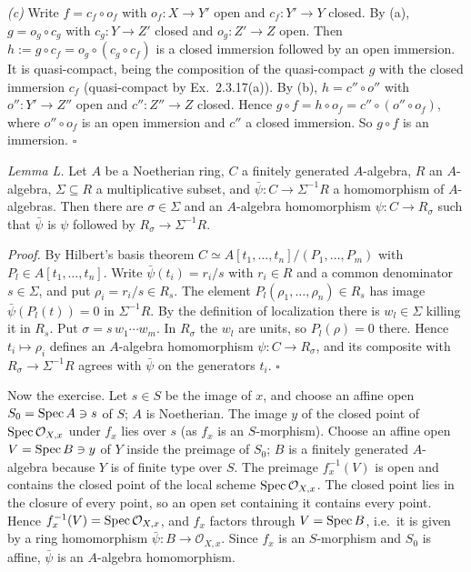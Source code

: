 \documentclass[11pt]{article}
\begin{document}
\emph{(c)} Write $f=c_f\circ o_f$ with $o_f:X\to Y'$ open and $c_f:Y'\to Y$ closed. By (a), $g=o_g\circ c_g$ with $c_g:Y\to Z'$ closed and $o_g:Z'\to Z$ open. Then $h:=g\circ c_f=o_g\circ(c_g\circ c_f)$ is a closed immersion followed by an open immersion. It is quasi-compact, being the composition of the quasi-compact $g$ with the closed immersion $c_f$ (quasi-compact by Ex.~2.3.17(a)). By (b), $h=c''\circ o''$ with $o'':Y'\to Z''$ open and $c'':Z''\to Z$ closed. Hence $g\circ f=h\circ o_f=c''\circ(o''\circ o_f)$, where $o''\circ o_f$ is an open immersion and $c''$ a closed immersion. So $g\circ f$ is an immersion. \hfill$\square$

\pf
\emph{Lemma L.} Let $A$ be a Noetherian ring, $C$ a finitely generated $A$-algebra, $R$ an $A$-algebra, $\Sigma\subseteq R$ a multiplicative subset, and $\bar\psi:C\to\Sigma^{-1}R$ a homomorphism of $A$-algebras. Then there are $\sigma\in\Sigma$ and an $A$-algebra homomorphism $\psi:C\to R_\sigma$ such that $\bar\psi$ is $\psi$ followed by $R_\sigma\to\Sigma^{-1}R$.

\emph{Proof.} By Hilbert's basis theorem $C\simeq A[t_1,\dots,t_n]/(P_1,\dots,P_m)$ with $P_l\in A[t_1,\dots,t_n]$. Write $\bar\psi(t_i)=r_i/s$ with $r_i\in R$ and a common denominator $s\in\Sigma$, and put $\rho_i=r_i/s\in R_s$. The element $P_l(\rho_1,\dots,\rho_n)\in R_s$ has image $\bar\psi(P_l(t))=0$ in $\Sigma^{-1}R$. By the definition of localization there is $w_l\in\Sigma$ killing it in $R_s$. Put $\sigma=s\,w_1\cdots w_m$. In $R_\sigma$ the $w_l$ are units, so $P_l(\rho)=0$ there. Hence $t_i\mapsto\rho_i$ defines an $A$-algebra homomorphism $\psi:C\to R_\sigma$, and its composite with $R_\sigma\to\Sigma^{-1}R$ agrees with $\bar\psi$ on the generators $t_i$. \hfill$\square$

Now the exercise. Let $s\in S$ be the image of $x$, and choose an affine open $S_0=\operatorname{Spec} A\ni s$ of $S$; $A$ is Noetherian. The image $y$ of the closed point of $\operatorname{Spec}\mathcal O_{X,x}$ under $f_x$ lies over $s$ (as $f_x$ is an $S$-morphism). Choose an affine open $V=\operatorname{Spec} B\ni y$ of $Y$ inside the preimage of $S_0$; $B$ is a finitely generated $A$-algebra because $Y$ is of finite type over $S$. The preimage $f_x^{-1}(V)$ is open and contains the closed point of the local scheme $\operatorname{Spec}\mathcal O_{X,x}$. The closed point lies in the closure of every point, so an open set containing it contains every point. Hence $f_x^{-1}(V)=\operatorname{Spec}\mathcal O_{X,x}$, and $f_x$ factors through $V=\operatorname{Spec} B$, i.e.\ it is given by a ring homomorphism $\bar\psi:B\to\mathcal O_{X,x}$. Since $f_x$ is an $S$-morphism and $S_0$ is affine, $\bar\psi$ is an $A$-algebra homomorphism.
\end{document}
